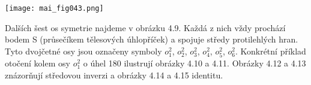 \begin{mdframed}[style=mdexam]
\begin{example}
    {\centering
      \captionsetup{type=figure}
      \label{mai:fig042}
    \par}

    {\centering
      \captionsetup{type=figure}
      \texttt{[image: mai\_fig043.png]}
      \par}

      Dalších šest os symetrie najdeme v obrázku 4.9. Každá z nich vždy prochází bodem S (průsečíkem
      tělesových úhlopříček) a spojuje středy protilehlých hran. Tyto dvojčetné osy jsou označeny
      symboly \(o_1^2\), \(o_2^2\), \(o_3^2\), \(o_4^2\), \(o_5^2\), \(o_6^2\). Konkrétní příklad
      otočení kolem osy \(o_1^2\) o úhel \qty{180}{\deg} ilustrují obrázky 4.10 a 4.11. Obrázky 4.12
      a 4.13 znázorňují středovou inverzi a obrázky 4.14 a 4.15 identitu.
      

\end{example}
\end{mdframed}
